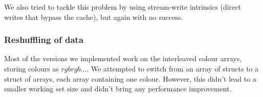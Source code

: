 We also tried to tackle this problem by using stream-write intrinsics (direct writes that bypass the cache), but again with no success.

\subsubsection{Reshuffling of data}


Most of the versions we implemented work on the interleaved colour arrays, storing colours as $rgbrgb\dots$. We attempted to switch from an array of structs to a struct of arrays, each array containing one colour. However, this didn't lead to a smaller working set size and didn't bring any performance improvement. 

%
%
%
%
